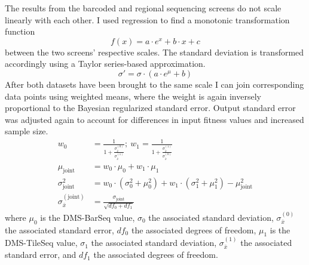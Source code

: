 The results from the barcoded and regional sequencing screens do not scale linearly with each other. I used regression to find a monotonic transformation function $$f(x) = a \cdot e^x + b \cdot x + c$$ between the two screens' respective scales. The standard deviation is transformed accordingly using a Taylor series-based approximation. $$ \sigma' = \sigma \cdot (a\cdot e^{\mu} + b)  $$ After both datasets have been brought to the same scale I can join corresponding data points using weighted means, where the weight is again inversely proportional to the Bayesian regularized standard error. Output standard error was adjusted again to account for differences in input fitness values and increased sample size. 
\begin{align*}
w_0 &= \frac{1}{1+\frac{\sigma_{\bar x}^{(0)}}{\sigma_{\bar x}^{(1)}}}; ~ w_1 = \frac{1}{1+\frac{\sigma_{\bar x}^{(1)}}{\sigma_{\bar x}^{(0)}}}\\
\mu_\text{joint} &= w_0 \cdot \mu_0 + w_1 \cdot \mu_1\\
\sigma_\text{joint}^2 &= w_0 \cdot (\sigma_0^2 + \mu_0^2) + w_1 \cdot (\sigma_1^2 + \mu_1^2) - \mu_\text{joint}^2\\
\sigma_{\bar x}^{(\text{joint})} &= \frac{\sigma_\text{joint}}{\sqrt{df_0 + df_1}}
\end{align*}
where $\mu_0$ is the DMS-BarSeq value, $\sigma_0$ the associated standard deviation, $\sigma_{\bar x}^{(0)}$ the associated standard error, $df_0$ the associated degrees of freedom, $\mu_1$ is the DMS-TileSeq value, $\sigma_1$ the associated standard deviation, $\sigma_{\bar x}^{(1)}$ the associated standard error, and $df_1$ the associated degrees of freedom.

